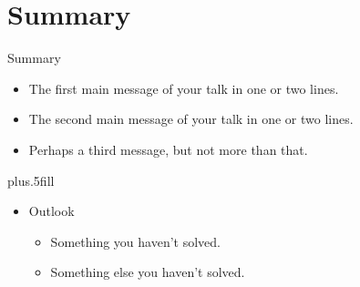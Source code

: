 \documentclass{beamer}
\begin{document}
\section*{Summary}

\begin{frame}{Summary}

  \begin{itemize}
  \item
    The \alert{first main message} of your talk in one or two lines.
  \item
    The \alert{second main message} of your talk in one or two lines.
  \item
    Perhaps a \alert{third message}, but not more than that.
  \end{itemize}
  
  \vskip0pt plus.5fill
  \begin{itemize}
  \item
    Outlook
    \begin{itemize}
    \item
      Something you haven't solved.
    \item
      Something else you haven't solved.
    \end{itemize}
  \end{itemize}
\end{frame}
\end{document}
